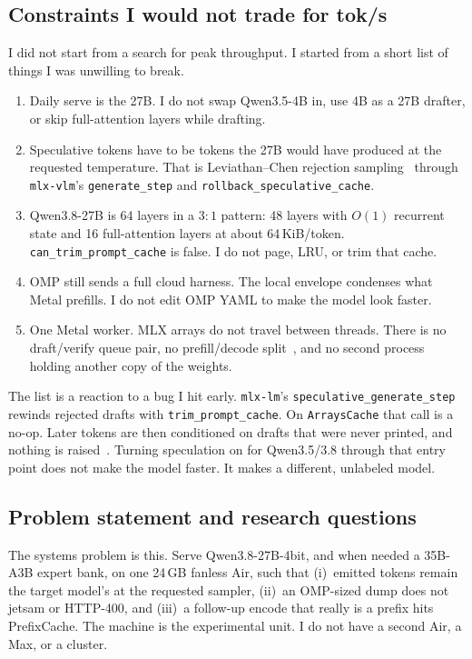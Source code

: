 \subsection{Constraints I would not trade for tok/s}

I did not start from a search for peak throughput. I started from a short list of things I was unwilling to break.

\begin{enumerate}[leftmargin=1.4em,itemsep=0.25em]
\item Daily serve is the 27B. I do not swap Qwen3.5-4B in, use 4B as a 27B drafter, or skip full-attention layers while drafting.
\item Speculative tokens have to be tokens the 27B would have produced at the requested temperature. That is Leviathan--Chen rejection sampling~\citep{leviathan2023speculative,chen2023accelerating} through \texttt{mlx-vlm}'s \texttt{generate\_step} and \texttt{rollback\_speculative\_cache}.
\item Qwen3.8-27B is 64 layers in a $3{:}1$ pattern: 48 \gdn{} layers with $O(1)$ recurrent state and 16 full-attention layers at about 64\,KiB/token. \texttt{can\_trim\_prompt\_cache} is false. I do not page, LRU, or trim that cache.
\item OMP still sends a full cloud harness. The local envelope condenses what Metal prefills. I do not edit OMP YAML to make the model look faster.
\item One Metal worker. MLX arrays do not travel between threads. There is no draft/verify queue pair, no prefill/decode split~\citep{zhong2024distserve}, and no second process holding another copy of the weights.
\end{enumerate}

The list is a reaction to a bug I hit early. \texttt{mlx-lm}'s \texttt{speculative\_generate\_step} rewinds rejected drafts with \texttt{trim\_prompt\_cache}. On \texttt{ArraysCache} that call is a no-op. Later tokens are then conditioned on drafts that were never printed, and nothing is raised~\citep{slotbankrepo}. Turning speculation on for Qwen3.5/3.8 through that entry point does not make the model faster. It makes a different, unlabeled model.

\subsection{Problem statement and research questions}
\label{sec:rqs}

The systems problem is this. Serve Qwen3.8-27B-4bit, and when needed a 35B-A3B expert bank, on one 24\,GB fanless Air, such that (i)~emitted tokens remain the target model's at the requested sampler, (ii)~an OMP-sized dump does not jetsam or HTTP-400, and (iii)~a follow-up encode that really is a prefix hits PrefixCache. The machine is the experimental unit. I do not have a second Air, a Max, or a cluster.

